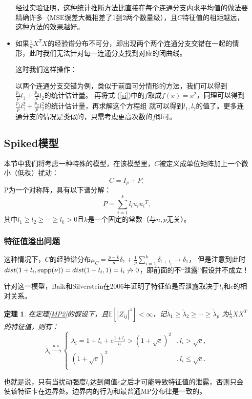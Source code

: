 \documentclass[UTF8,12pt]{ctexart}
\newtheorem{theorem}{定理}
\begin{document}
\begin{itemize}
    经过实验证明，这种统计推断方法比直接在每个连通分支内求平均值的做法要精确许多（MSE误差大概相差了1到2两个数量级）\cite{couillet_liao_2022}，且$C$特征值的相距越远，这种方法的效果越好。

    \item 如果$\frac{1}{n}X^T X$的经验谱分布不可分，即出现两个两个连通分支交错在一起的情形，此时我们无法针对每一连通分支找到对应的闭曲线。
    
    这时我们这样操作：
    
    以两个连通分支交错为例，类似于前面可分情形的方法，我们可以得到$\frac{p_1}{p}l_1 + \frac{p_2}{p}l_2$的统计估计量。
    再将式 (\ref{si})中的$f$取成$f(x) = x^2$，同理可以得到$\frac{p_1}{p}l_1^2 + \frac{p_2}{p}l_2^2$的统计估计量，再求解这个方程组
    就可以得到$l_1,l_2$的值了。更多连通分支的情况是类似的，只需考虑更高次数的$f$即可。
\end{itemize}

\subsection{Spiked模型}
本节中我们将考虑一种特殊的模型，在该模型里，$C$被定义成单位矩阵加上一个微小（低秩）扰动：
\[
    C = I_p + P,
\]  
P为一个对称阵，具有以下谱分解：
\[
    P = \sum\limits_{i=1}^{k}l_i u_i {u_i}^T,
\]
其中$l_1\geq l_2 \geq \cdots \geq l_k >0$且$k$是一个固定的常数（与$n,p$无关）。

\subsubsection{特征值溢出问题}
这种情况下，$C$的经验谱分布$\mu_C = \frac{p-k}{p}\delta_1 + \frac{1}{p}\sum\limits_{i=1}^k \delta_{1+l_i} \rightarrow \delta_1$，
但是注意到此时$dist(1+l_i,\textup{supp}(\nu)) = dist(1+l_i,1) = l_i \not\rightarrow 0$，即前面的不“泄露”假设并不成立！

针对这一模型，Baik和Silverstein在2006年证明了特征值是否泄露取决于$l_i$和$c$的相对关系\cite{spike1}。

\begin{theorem}\label{spiked}
    在定理\ref{MP2}的假设下，且$\mathbb E[{|Z_{ij}|}^4] < \infty$，记$\tilde{\lambda}_1 \geq \tilde{\lambda}_2 \geq \cdots \geq \tilde{\lambda}_p$
    为$\frac{1}{n}XX^T$的特征值，则有：
    \[
        \tilde{\lambda}_i \stackrel{a.s.}{\longrightarrow} 
        \begin{cases}
            \lambda_i = 1+l_i + c \frac{1+l_i}{l_i} > {(1+\sqrt{c})}^2 &, l_i > \sqrt{c}, \\
            {(1+\sqrt{c})}^2 &, l_i \leq \sqrt{c}. \\
        \end{cases}
    \]  
\end{theorem}
也就是说，只有当扰动强度$l_i$达到阈值$c$之后才可能导致特征值的泄露，否则只会使该特征卡在边界处。边界内的行为和最普通MP分布律是一致的。
\end{document}
